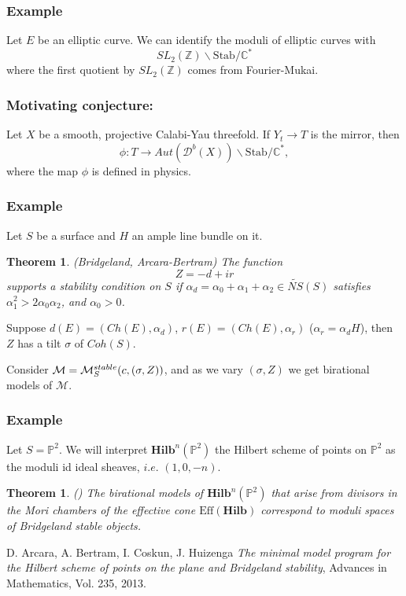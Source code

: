 \documentclass[reqno]{amsart}
\theoremstyle{plain}
\newtheorem{theo}[theorem]{Theorem}
\theoremstyle{definition}
\theoremstyle{remark}
\begin{document}
\subsubsection*{Example}
Let $E$ be an elliptic curve. We can identify the moduli of elliptic curves with $$SL_2(\mathbb{Z})\backslash \mathrm{Stab}/\mathbb{C}^* $$
where the first quotient by $SL_2(\mathbb{Z})$ comes from Fourier-Mukai.

\bigskip

\subsubsection*{Motivating conjecture:}
Let $X$ be a smooth, projective Calabi-Yau threefold. If $Y_t\rightarrow T$  is the mirror, then $$\phi:T\longrightarrow Aut(\mathcal{D}^b(X))\backslash \mathrm{Stab}/\mathbb{C}^*, $$ where the map $\phi$ is defined in physics.


\subsubsection*{Example}
Let $S$ be a surface and $H$ an ample line bundle on it.
\begin{theo}(Bridgeland, Arcara-Bertram)
The function $$Z=-d+ir$$ supports a stability condition on $S$ if $\alpha_d=\alpha_0+\alpha_1+\alpha_2\in \tilde{NS}(S)$ satisfies $\alpha_1^2>2\alpha_0\alpha_2$, and $\alpha_0>0$.
\end{theo}

Suppose $d(E)=(Ch(E),\alpha_d)$, $r(E)=(Ch(E),\alpha_r)$ ($\alpha_r=\alpha_dH$), then $Z$ has a tilt $\sigma$ of $Coh(S)$.

\medskip
Consider $\mathcal{M}=\mathcal{M}^{\tiny{stable}}_S(c,(\sigma,Z))$, and as we vary $(\sigma,Z)$ we get birational models of $\mathcal{M}$.
\subsubsection*{Example} Let $S=\mathbb{P}^2$. We will interpret $\mathbf{Hilb}^n(\mathbb{P}^2)$ the Hilbert scheme of points on $\mathbb{P}^2$ as the moduli id ideal sheaves, $i.e.$ $(1,0,-n)$.
\begin{theo}(\cite{ABCH}) The birational models of $\mathbf{Hilb}^n(\mathbb{P}^2)$ that arise from divisors in the Mori chambers of the effective cone $\mathrm{Eff}(\mathbf{Hilb})$ correspond to moduli spaces of Bridgeland stable objects.
\end{theo}


\bigskip
\begin{thebibliography}{C}

D. Arcara, A. Bertram, I. Coskun, J. Huizenga \emph{The minimal model program for the Hilbert scheme of points on the plane and Bridgeland stability}, Advances in Mathematics, Vol. 235, 2013.

\end{thebibliography}
\end{document}
